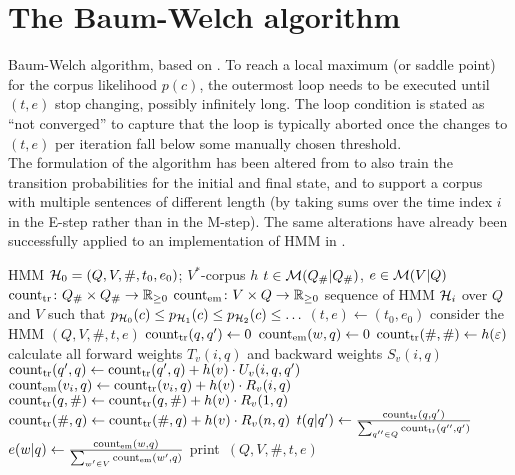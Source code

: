 \section{The Baum-Welch algorithm}

\begin{algorithm}[p!]
 \caption{Baum-Welch algorithm, based on \cite[p.~226]{jm09}. To reach a local
 maximum (or saddle point) for the corpus likelihood $p(c)$, the outermost loop
 needs to be executed until $(t,e)$ stop changing, possibly infinitely long.
 The loop condition is stated as ``not converged'' to capture that the loop is
 typically aborted once the changes to $(t,e)$ per iteration fall below some
 manually chosen threshold.\\[1em]
 The formulation of the algorithm has been altered from \cite{jm09} to also
 train the transition probabilities for the initial and final state, and to
 support a corpus with multiple sentences of different length (by taking sums
 over the time index $i$ in the E-step rather than in the M-step). The same
 alterations have already been successfully applied to an implementation of HMM
 in \cite{nel13}. \label{alg:bw-vogler}}
 \begin{algorithmic}[1]
  \algorithmheader[Input:] HMM $\mathcal H_0 = (Q,V,\#,t_0,e_0)$; $V^*$-corpus $h$
  \algorithmheader[Variables:] $t\in\mathcal M(Q_\#|Q_\#)$, $e\in\mathcal M(V|Q)$
  \algorithmheader             $\operatorname{count}_\mathrm{tr}\colon Q_\#\times Q_\#\to\mathbb R_{\geq0}$
  \algorithmheader             $\operatorname{count}_\mathrm{em}\colon V\times Q\to\mathbb R_{\geq0}$
  \algorithmheader[Output:] sequence of HMM $\mathcal H_i$ over $Q$ and $V$
  \algorithmheader such that $p_{\mathcal H_0}(c) \leq p_{\mathcal H_1}(c) \leq p_{\mathcal H_2}(c) \leq \ldots$
  \STATE $(t,e) \leftarrow (t_0,e_0)$
   \STATE consider the HMM $(Q,V,\#,t,e)$
   \STATE $\operatorname{count}_\mathrm{tr}(q,q') \leftarrow 0$ 
   \STATE $\operatorname{count}_\mathrm{em}(w,q) \leftarrow 0$ 
   \STATE $\operatorname{count}_\mathrm{tr}(\#,\#) \leftarrow h(\varepsilon)$
    \STATE calculate all forward weights $T_v(i,q)$ and backward weights $S_v(i,q)$
      \STATE $\operatorname{count}_\mathrm{tr}(q',q) \leftarrow \operatorname{count}_\mathrm{tr}(q',q) + h(v) \cdot U_v(i,q,q')$
     \ENDFOR
    \ENDFOR
      \STATE $\operatorname{count}_\mathrm{em}(v_i,q) \leftarrow \operatorname{count}_\mathrm{tr}(v_i,q) + h(v) \cdot R_v(i,q)$
     \ENDFOR
    \ENDFOR
     \STATE $\operatorname{count}_\mathrm{tr}(q,\#) \leftarrow \operatorname{count}_\mathrm{tr}(q,\#) + h(v) \cdot R_v(1,q)$
     \STATE $\operatorname{count}_\mathrm{tr}(\#,q) \leftarrow \operatorname{count}_\mathrm{tr}(\#,q) + h(v) \cdot R_v(n,q)$
    \ENDFOR
   \ENDFOR
    \STATE $t(q|q') \leftarrow \frac{\operatorname{count}_\mathrm{tr}(q,q')}{\sum_{q''\in Q} \operatorname{count}_\mathrm{tr}(q'',q')}$
   \ENDFOR
    \STATE $e(w|q) \leftarrow \frac{\operatorname{count}_\mathrm{em}(w,q)}{\sum_{w'\in V} \operatorname{count}_\mathrm{em}(w',q)}$
   \ENDFOR
   \STATE print~$(Q,V,\#,t,e)$
  \ENDWHILE
 \end{algorithmic}
\end{algorithm}

